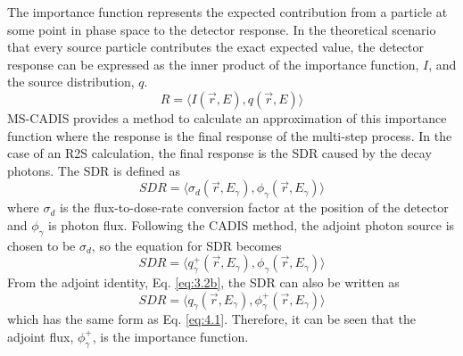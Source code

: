 The importance function represents the expected contribution from a particle 
at some point in phase space to the detector response.
In the theoretical scenario that every source particle contributes the exact 
expected value, the detector response can be
expressed as the inner product of the importance function, $I$, and the source
distribution, $q$.
\begin{equation} \label{eq:4.1}
R = %
    \langle I(\overrightarrow{r}, E), 
    q(\overrightarrow{r}, E) \rangle
\end{equation}
MS-CADIS provides a method to calculate an approximation of this importance function
where the response is the final response of the multi-step process.  In the case
of an R2S calculation, the final response is the SDR caused by the decay
photons.  The SDR is defined as 
\begin{equation} \label{eq:4.2}
  SDR =  \langle \sigma_{d}(\overrightarrow{r},E_{\gamma}),
  \phi_{\gamma}(\overrightarrow{r}, E_{\gamma}) \rangle
\end{equation}
where $\sigma_{d}$ is the flux-to-dose-rate conversion factor at the position of
the detector and $\phi_{\gamma}$ is photon flux.
Following the CADIS method, the adjoint photon source is chosen to be $\sigma_d$,
so the equation for SDR becomes 
\begin{equation} \label{eq:4.2.1}
	SDR =  \langle q_{\gamma}^{+}(\overrightarrow{r},E_{\gamma}),
                       \phi_{\gamma}(\overrightarrow{r}, E_{\gamma}) \rangle 
\end{equation}
From the adjoint identity, Eq. \ref{eq:3.2b}, the SDR can also be written as 
\begin{equation} \label{eq:4.3}
	SDR =
	\langle q_{\gamma}(\overrightarrow{r},E_{\gamma}),
  \phi_{\gamma}^{+}(\overrightarrow{r}, E_{\gamma}) \rangle 
\end{equation}
which has the same form as Eq. \ref{eq:4.1}.  Therefore, it can be seen that 
the adjoint flux, $\phi_{\gamma}^+$, is the importance function.

